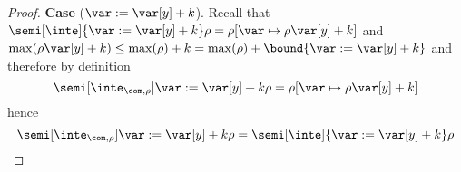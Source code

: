 \begin{proof}
  \medskip

  \noindent
  \textbf{Case} (\(\var := \var[y] + k\)).
  Recall that
  \({\semi[\inte]{\var := \var[y] + k}\rho} = {\rho[\var \mapsto
    \rho\var[y] + k]}\) and
  \({\max(\rho\var[y] + k)} \leq {\max(\rho) + k} = {\max(\rho) +
    \bound{\var := \var[y] + k}}\) and therefore by definition
  \begin{equation*}
    \semi[\inte_{\com,\rho}]{\var := \var[y] + k}\rho = \rho[\var \mapsto \rho\var[y] + k]
  \end{equation*}
  hence
  \begin{equation*}
    \semi[\inte_{\com,\rho}]{\var := \var[y] + k}\rho = \semi[\inte]{\var := \var[y] + k}\rho
  \end{equation*}

  \medskip


\end{proof}
